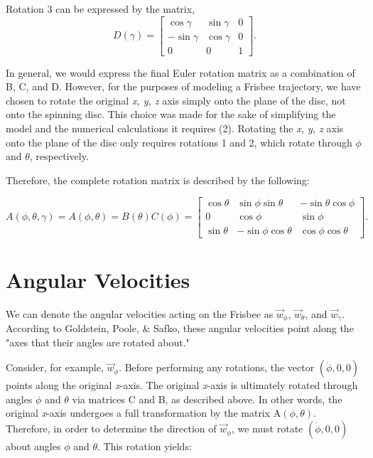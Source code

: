 \documentclass[a4paper,12pt, oneside]{article}
\begin{document}
Rotation 3 can be expressed by the matrix, 
\begin{equation*}
D(\gamma)=\begin{bmatrix}
\cos\gamma & \sin\gamma & 0 \\
-\sin\gamma & \cos\gamma & 0 \\
0 & 0 & 1
\end{bmatrix}.
\end{equation*}

In general, we would express the final Euler rotation matrix as a combination of B, C, and D. However, for the purposes of modeling a Frisbee trajectory, we have chosen to rotate the original \textit{x, y, z} axis simply onto the plane of the disc, not onto the spinning disc. This choice was made for the sake of simplifying the model and the numerical calculations it requires (2). Rotating the \textit{x, y, z} axis onto the plane of the disc only requires rotations 1 and 2, which rotate through $\phi$ and $\theta$, respectively.

Therefore, the complete rotation matrix is described by the following:

\begin{equation*}
A(\phi,\theta,\gamma)=A(\phi,\theta)=B(\theta)C(\phi)=\begin{bmatrix}
\cos\theta & \sin\phi\sin\theta & -\sin\theta\cos\phi \\
0 & \cos\phi & \sin\phi \\
\sin\theta & -\sin\phi\cos\theta & \cos\phi\cos\theta
\end{bmatrix}.
\end{equation*}

\section{Angular Velocities}
We can denote the angular velocities acting on the Frisbee as $\vec{w}_\phi$, $\vec{w}_\theta$, and $\vec{w}_\gamma$.  According to Goldstein, Poole, \& Safko, these angular velocities point along the "axes that their angles are rotated about."

Consider, for example, $\vec{w}_\phi$.  Before performing any rotations, the vector $(\dot\phi, 0, 0)$ points along the original \textit{x}-axis.  The original \textit{x}-axis is ultimately rotated through angles $\phi$ and $\theta$ via matrices C and B, as described above. In other words, the original \textit{x}-axis undergoes a full transformation by the matrix A$(\phi,\theta)$. Therefore, in order to determine the direction of $\vec{w}_\phi$, we must rotate $(\dot\phi, 0, 0)$ about angles $\phi$ and $\theta$.  This rotation yields:
\end{document}
